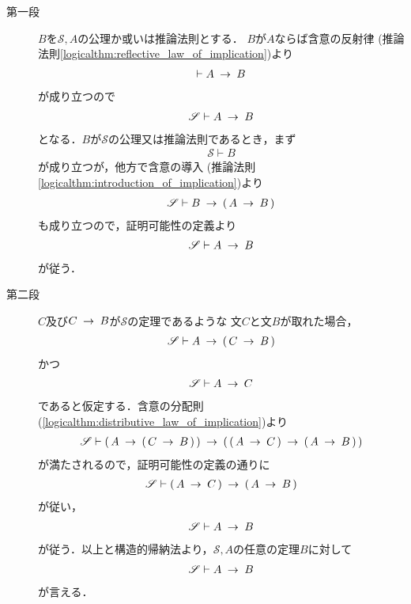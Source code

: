 	\begin{metaprf}\mbox{}
		\begin{description}
			\item[第一段]
				$B$を$\mathscr{S},A$の公理か或いは推論法則とする．
				$B$が$A$ならば含意の反射律
				(推論法則\ref{logicalthm:reflective_law_of_implication})より
				\begin{align}
					\vdash A \hspace{0.25em}\rightarrow\hspace{0.25em} B
				\end{align}
				が成り立つので
				\begin{align}
					\mathscr{S} \vdash A \hspace{0.25em}\rightarrow\hspace{0.25em} B
				\end{align}
				となる．$B$が$\mathscr{S}$の公理又は推論法則であるとき，まず
				\begin{align}
					\mathscr{S} \vdash B
				\end{align}
				が成り立つが，他方で含意の導入
				(推論法則\ref{logicalthm:introduction_of_implication})より
				\begin{align}
					\mathscr{S} \vdash B \hspace{0.25em}\rightarrow\hspace{0.25em} (\, A \hspace{0.25em}\rightarrow\hspace{0.25em} B\, ) 
				\end{align}
				も成り立つので，証明可能性の定義より
				\begin{align}
					\mathscr{S} \vdash A \hspace{0.25em}\rightarrow\hspace{0.25em} B
				\end{align}
				が従う．
				
			\item[第二段]
				$C$及び$C \hspace{0.25em}\rightarrow\hspace{0.25em} B$が$\mathscr{S}$の定理であるような
				文$C$と文$B$が取れた場合，
				\begin{align}
					\mathscr{S} \vdash A \hspace{0.25em}\rightarrow\hspace{0.25em} (\, C \hspace{0.25em}\rightarrow\hspace{0.25em} B\, )
				\end{align}
				かつ
				\begin{align}
					\mathscr{S} \vdash A \hspace{0.25em}\rightarrow\hspace{0.25em} C
				\end{align}
				であると仮定する．含意の分配則
				(\ref{logicalthm:distributive_law_of_implication})より
				\begin{align}
					\mathscr{S} \vdash 
					(\, A \hspace{0.25em}\rightarrow\hspace{0.25em} (\, C \hspace{0.25em}\rightarrow\hspace{0.25em} B\, )\, ) 
					\hspace{0.25em}\rightarrow\hspace{0.25em} (\, (\, A \hspace{0.25em}\rightarrow\hspace{0.25em} C\, ) \hspace{0.25em}\rightarrow\hspace{0.25em} (\, A \hspace{0.25em}\rightarrow\hspace{0.25em} B\, )\, )
				\end{align}
				が満たされるので，証明可能性の定義の通りに
				\begin{align}
					\mathscr{S} \vdash (\, A \hspace{0.25em}\rightarrow\hspace{0.25em} C\, ) 
					\hspace{0.25em}\rightarrow\hspace{0.25em} (\, A \hspace{0.25em}\rightarrow\hspace{0.25em} B\, )
				\end{align}
				が従い，
				\begin{align}
					\mathscr{S} \vdash A \hspace{0.25em}\rightarrow\hspace{0.25em} B
				\end{align}
				が従う．以上と構造的帰納法より，$\mathscr{S},A$の任意の定理$B$に対して
				\begin{align}
					\mathscr{S} \vdash A \hspace{0.25em}\rightarrow\hspace{0.25em} B
				\end{align}
				が言える．
				\QED
		\end{description}
	\end{metaprf}
	
